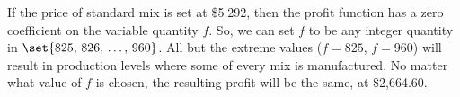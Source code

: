 If the price of standard mix is set at \$5.292, then the profit function has a zero coefficient on the variable quantity $f$.  So, we can set $f$ to be any integer quantity in $\set{825,\,826,\,\ldots,\,960}$.  All but the extreme values ($f=825$, $f=960$) will result in production levels where some of every mix is manufactured.  No matter what value of $f$ is chosen, the resulting profit will be the same, at \$2,664.60.